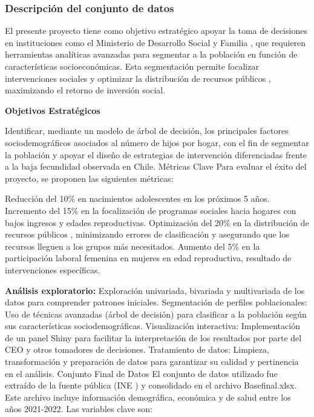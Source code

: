 \documentclass[
]{article}
\begin{document}
\subsubsection{Descripción del conjunto de
datos}\label{descripciuxf3n-del-conjunto-de-datos}

El presente proyecto tiene como objetivo estratégico apoyar la toma de
decisiones en instituciones como el Ministerio de Desarrollo Social y
Familia , que requieren herramientas analíticas avanzadas para segmentar
a la población en función de características socioeconómicas. Esta
segmentación permite focalizar intervenciones sociales y optimizar la
distribución de recursos públicos , maximizando el retorno de inversión
social.

\textbf{Objetivos Estratégicos}

Identificar, mediante un modelo de árbol de decisión, los principales
factores sociodemográficos asociados al número de hijos por hogar, con
el fin de segmentar la población y apoyar el diseño de estrategias de
intervención diferenciadas frente a la baja fecundidad observada en
Chile. Métricas Clave Para evaluar el éxito del proyecto, se proponen
las siguientes métricas:

Reducción del 10\% en nacimientos adolescentes en los próximos 5 años.
Incremento del 15\% en la focalización de programas sociales hacia
hogares con bajos ingresos y edades reproductivas. Optimización del 20\%
en la distribución de recursos públicos , minimizando errores de
clasificación y asegurando que los recursos lleguen a los grupos más
necesitados. Aumento del 5\% en la participación laboral femenina en
mujeres en edad reproductiva, resultado de intervenciones específicas.

\textbf{Análisis exploratorio:} Exploración univariada, bivariada y
multivariada de los datos para comprender patrones iniciales.
Segmentación de perfiles poblacionales: Uso de técnicas avanzadas (árbol
de decisión) para clasificar a la población según sus características
sociodemográficas. Visualización interactiva: Implementación de un panel
Shiny para facilitar la interpretación de los resultados por parte del
CEO y otros tomadores de decisiones. Tratamiento de datos: Limpieza,
transformación y preparación de datos para garantizar su calidad y
pertinencia en el análisis. Conjunto Final de Datos El conjunto de datos
utilizado fue extraído de la fuente pública (INE ) y consolidado en el
archivo Basefinal.xlsx. Este archivo incluye información demográfica,
económica y de salud entre los años 2021-2022. Las variables clave son:
\end{document}
